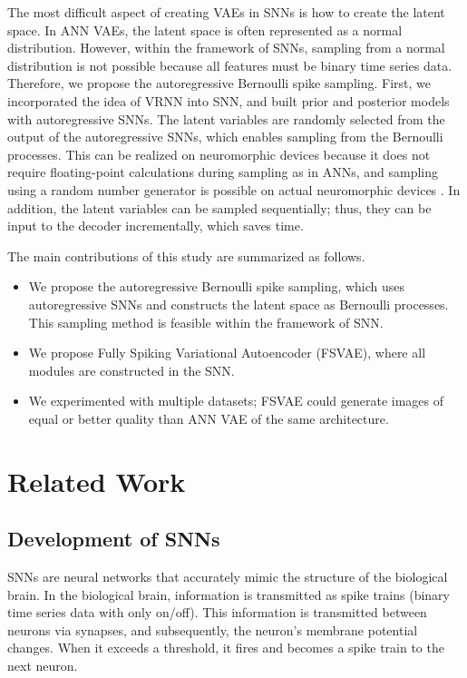 \documentclass[letterpaper]{article} %
\begin{document}
The most difficult aspect of creating VAEs in SNNs is how to create the latent space. In ANN VAEs, the latent space is often represented as a normal distribution. However, within the framework of SNNs, sampling from a normal distribution is not possible because all features must be binary time series data. Therefore, we propose the autoregressive Bernoulli spike sampling. First, we incorporated the idea of VRNN \cite{vrnn} into SNN, and built prior and posterior models with autoregressive SNNs. The latent variables are randomly selected from the output of the autoregressive SNNs, which enables sampling from the Bernoulli processes. This can be realized on neuromorphic devices because it does not require floating-point calculations during sampling as in ANNs, and sampling using a random number generator is possible on actual neuromorphic devices \cite{truenorthrandom, loihi}. In addition, the latent variables can be sampled sequentially; thus, they can be input to the decoder incrementally, which saves time.

The main contributions of this study are summarized as follows.

\begin{itemize}
    \item We propose the autoregressive Bernoulli spike sampling, which uses autoregressive SNNs and constructs the latent space as Bernoulli processes. This sampling method is feasible within the framework of SNN.
    \item We propose Fully Spiking Variational Autoencoder (FSVAE), where all modules are constructed in the SNN.
    \item We experimented with multiple datasets; FSVAE could generate images of equal or better quality than ANN VAE of the same architecture.
\end{itemize}

\section{Related Work}
\subsection{Development of SNNs}

SNNs are neural networks that accurately mimic the structure of the biological brain. In the biological brain, information is transmitted as spike trains (binary time series data with only on/off). This information is transmitted between neurons via synapses, and subsequently, the neuron's membrane potential changes. When it exceeds a threshold, it fires and becomes a spike train to the next neuron.
\end{document}
